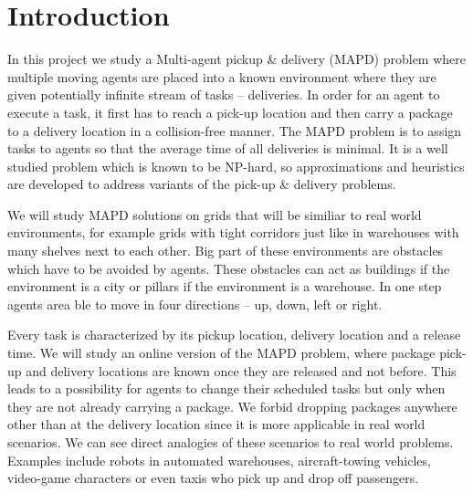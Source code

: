 \chapter*{Introduction}
In this project we study a Multi-agent pickup \& delivery (MAPD) problem 
where multiple moving agents are placed into a known environment where they are
given potentially infinite stream
of tasks -- deliveries. In order for an agent to execute a task, it first has to
reach a pick-up location and then carry a package to a delivery location in a
collision-free manner. The
MAPD problem is to assign tasks to agents so that the average time of all 
deliveries is minimal. It is a well studied problem which is known to be
NP-hard, so approximations and heuristics are developed to address variants of
the pick-up \& delivery problems. 

\vspace{5mm}\noindent
We will study MAPD solutions on grids that will be
similiar to real world environments, for example grids with tight corridors just
like in warehouses with many shelves next to each other. Big part of these environments
are obstacles which have to be avoided by agents. These obstacles can act as
buildings if the environment is a city or pillars if the environment is a
warehouse.
In one step agents area ble to move
in four directions -- up, down, left or right.


\vspace{5mm}\noindent Every task is characterized by
its pickup location, delivery location and a release time. We will study an
online version of the MAPD problem, where package pick-up and delivery locations
are known once they are released and not before. This leads to a possibility for
agents to change their scheduled tasks but only when they are not already carrying
a package. We forbid dropping packages anywhere other than at the delivery location
since it is more applicable in real world scenarios. 
We can see direct analogies of these scenarios to real 
world problems. Examples include robots in automated warehouses, 
aircraft-towing vehicles, video-game characters or even taxis who pick up and
drop off passengers.\cite{PDP}\cite{Liu}

